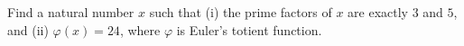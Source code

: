 Find a natural number $x$ such that (i) the prime factors of $x$ are exactly $3$ and $5$, and (ii) $\varphi(x)=24$, where $\varphi$ is Euler's totient function.
